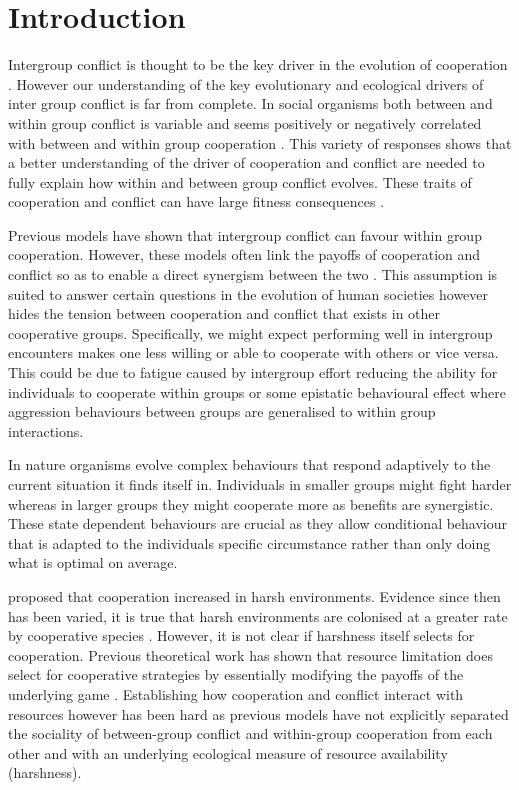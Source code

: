 \section{Introduction}

Intergroup conflict is thought to be the key driver in the evolution of cooperation \citep{radfordWithingroupBehavioural2016,kappelerMindGap2010,barkerWithingroupCompetition2012}. 
However our understanding of the key evolutionary and ecological drivers of inter group conflict is far from complete. 
In social organisms both between and within group conflict is variable and seems positively or negatively correlated with between and within group cooperation \citep{radfordWithingroupBehavioural2016}. 
This variety of responses shows that a better understanding of the driver of cooperation and conflict are needed to fully explain how within and between group conflict evolves. 
These traits of cooperation and conflict can have large fitness consequences \citep{thompsonCausesConsequences2017,vitikainenLiveLong2019}.

Previous models have shown that intergroup conflict can favour within group cooperation. 
However, these models often link the payoffs of cooperation and conflict so as to enable a direct synergism between the two \citep{choiCoevolutionParochial2007,lehmannWarEvolution2008a}. 
This assumption is suited to answer certain questions in the evolution of human societies however hides the tension between cooperation and conflict that exists in other cooperative groups. 
Specifically, we might expect performing well in intergroup encounters makes one less willing or able to cooperate with others or vice versa. 
This could be due to fatigue caused by intergroup effort reducing the ability for individuals to cooperate within groups or some epistatic behavioural effect where aggression behaviours between groups are generalised to within group interactions.

In nature organisms evolve complex behaviours that respond adaptively to the current situation it finds itself in. Individuals in smaller groups might fight harder whereas in larger groups they might cooperate more as benefits are synergistic. 
These state dependent behaviours are crucial as they allow conditional behaviour that is adapted to the individuals specific circumstance rather than only doing what is optimal on average. 

 proposed that cooperation increased in harsh environments. Evidence since then has been varied, it is true that harsh environments are colonised at a greater rate by cooperative species \citep{cornwallisCooperationFacilitates2017}. However, it is not clear if harshness itself selects for cooperation. Previous theoretical work has shown that resource limitation does select for cooperative strategies by essentially modifying the payoffs of the underlying game \citep{requejoEvolutionCooperation2011,smaldinoIncreasedCosts2013}. Establishing how cooperation and conflict interact with resources however has been hard as previous models have not explicitly separated the sociality of between-group conflict and within-group cooperation from each other and with an underlying ecological measure of resource availability (harshness). 

